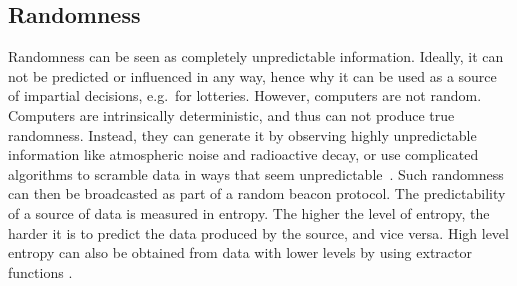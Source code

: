 \subsection{Randomness}
Randomness can be seen as completely unpredictable information. Ideally, it can not be predicted or influenced in any way, hence why it can be used as a source of impartial decisions, e.g.\ for lotteries.
However, computers are not random. Computers are intrinsically deterministic, and thus can not produce true randomness. Instead, they can generate it by observing highly unpredictable information like atmospheric noise and radioactive decay, or use complicated algorithms to scramble data in ways that seem unpredictable~\cite{randomsources}. Such randomness can then be broadcasted as part of a random beacon protocol. 
The predictability of a source of data is measured in entropy. The higher the level of entropy, the harder it is to predict the data produced by the source, and vice versa. High level entropy can also be obtained from data with lower levels by using extractor functions \cite{pseudorandomness}. 

